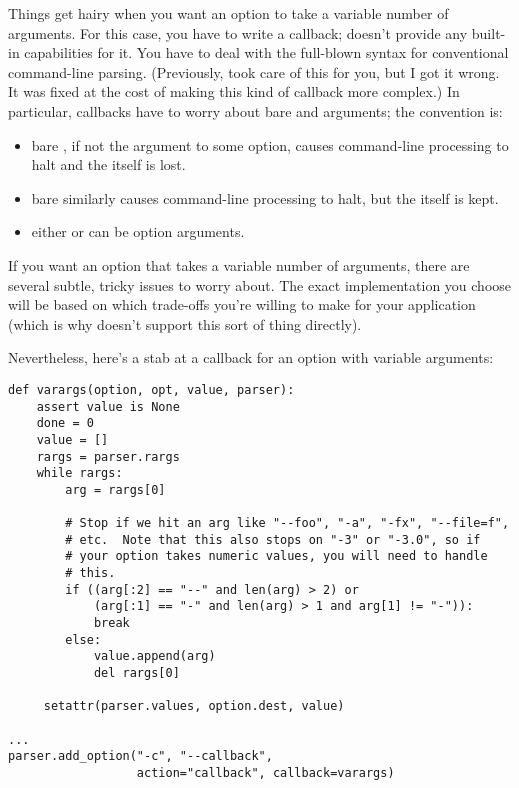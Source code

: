 
Things get hairy when you want an option to take a variable number of
arguments.  For this case, you have to write a callback;
 doesn't provide any built-in capabilities for it.
You have to deal with the full-blown syntax for conventional \UNIX{}
command-line parsing.  (Previously,  took care of
this for you, but I got it wrong.  It was fixed at the cost of making
this kind of callback more complex.)  In particular, callbacks have to
worry about bare \longprogramopt{} and \programopt{-} arguments; the
convention is:

\begin{itemize}
\item bare \longprogramopt{}, if not the argument to some option,
causes command-line processing to halt and the \longprogramopt{}
itself is lost.

\item bare \programopt{-} similarly causes command-line processing to
halt, but the \programopt{-} itself is kept.

\item either \longprogramopt{} or \programopt{-} can be option
arguments.
\end{itemize}

If you want an option that takes a variable number of arguments, there
are several subtle, tricky issues to worry about.  The exact
implementation you choose will be based on which trade-offs you're
willing to make for your application (which is why 
doesn't support this sort of thing directly).

Nevertheless, here's a stab at a callback for an option with variable
arguments:

\begin{verbatim}
def varargs(option, opt, value, parser):
    assert value is None
    done = 0
    value = []
    rargs = parser.rargs
    while rargs:
        arg = rargs[0]

        # Stop if we hit an arg like "--foo", "-a", "-fx", "--file=f",
        # etc.  Note that this also stops on "-3" or "-3.0", so if
        # your option takes numeric values, you will need to handle
        # this.
        if ((arg[:2] == "--" and len(arg) > 2) or
            (arg[:1] == "-" and len(arg) > 1 and arg[1] != "-")):
            break
        else:
            value.append(arg)
            del rargs[0]

     setattr(parser.values, option.dest, value)

...
parser.add_option("-c", "--callback",
                  action="callback", callback=varargs)
\end{verbatim}

